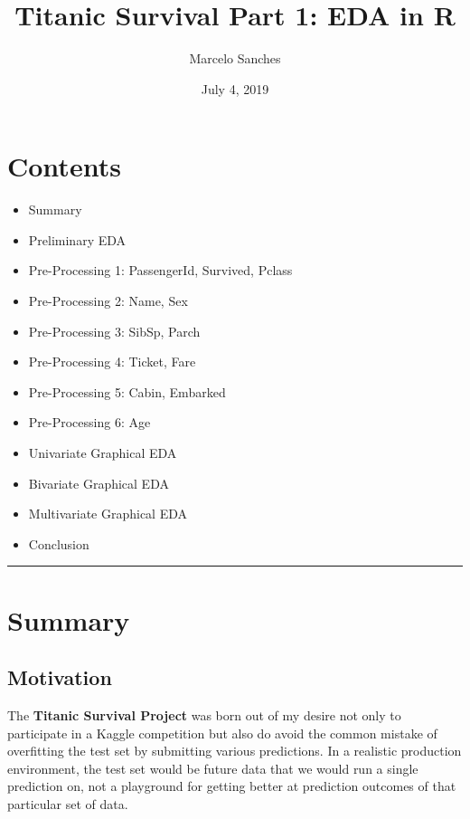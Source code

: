 \documentclass[]{article}
\title{Titanic Survival Part 1: EDA in R}
\author{Marcelo Sanches}
\date{July 4, 2019}
\providecommand{\tightlist}{%
  \setlength{\itemsep}{0pt}\setlength{\parskip}{0pt}}
\begin{document}
\maketitle

\section{Contents}\label{contents}

\begin{itemize}
\tightlist
\item
  Summary
\item
  Preliminary EDA
\item
  Pre-Processing 1: PassengerId, Survived, Pclass
\item
  Pre-Processing 2: Name, Sex
\item
  Pre-Processing 3: SibSp, Parch
\item
  Pre-Processing 4: Ticket, Fare
\item
  Pre-Processing 5: Cabin, Embarked
\item
  Pre-Processing 6: Age
\item
  Univariate Graphical EDA
\item
  Bivariate Graphical EDA
\item
  Multivariate Graphical EDA
\item
  Conclusion
\end{itemize}

\begin{center}\rule{0.5\linewidth}{\linethickness}\end{center}

\section{Summary}\label{summary}

\subsection{Motivation}\label{motivation}

The \textbf{Titanic Survival Project} was born out of my desire not only
to participate in a Kaggle competition but also do avoid the common
mistake of overfitting the test set by submitting various predictions.
In a realistic production environment, the test set would be future data
that we would run a single prediction on, not a playground for getting
better at prediction outcomes of that particular set of data.
\end{document}
